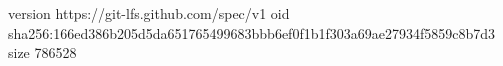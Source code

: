version https://git-lfs.github.com/spec/v1
oid sha256:166ed386b205d5da651765499683bbb6ef0f1b1f303a69ae27934f5859c8b7d3
size 786528
